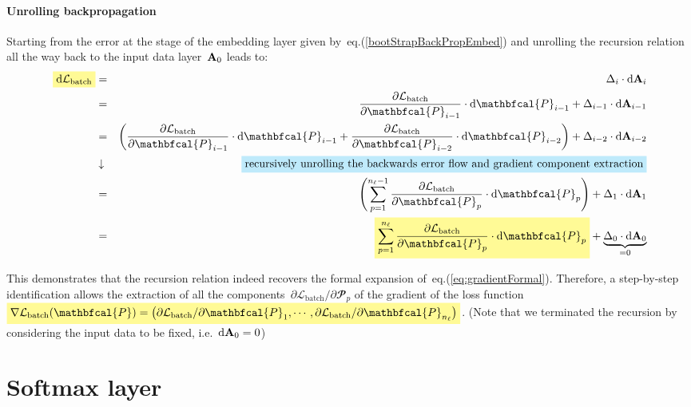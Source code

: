 \documentclass{article}
\newcommand{\mathcolorbox}[2]{\colorbox{#1}{$\displaystyle #2$}}
\begin{document}
\paragraph{Unrolling backpropagation} Starting from the error at the stage of the embedding layer given by~eq.(\ref{bootStrapBackPropEmbed}) and unrolling the recursion relation all the way back to the input data layer~${\bf A}_0$ leads to:
\begin{eqnarray*}
\mathcolorbox{shadecolor}{\text{d} \mathcal{L}_\text{batch}} &=& \Delta_i \cdot \text{d} {\bf A}_i \\ 
&=& \frac{\partial \mathcal{L}_{\text{batch}}}{\partial \mathbfcal{P}_{i-1}} \cdot \text{d}\mathbfcal{P}_{i-1} + \Delta_{i-1} \cdot \text{d}{\bf A}_{i-1} \\
&=& \left( \frac{\partial \mathcal{L}_{\text{batch}}}{\partial \mathbfcal{P}_{i-1}} \cdot \text{d}\mathbfcal{P}_{i-1} + \frac{\partial \mathcal{L}_{\text{batch}}}{\partial \mathbfcal{P}_{i-2}} \cdot \text{d}\mathbfcal{P}_{i-2}  \right) + \Delta_{i-2} \cdot \text{d} {\bf A}_{i-2} \\
&\downarrow& \colorbox{light-blue}{recursively unrolling the backwards error flow and gradient component extraction} \nonumber \\
&=& \left( \sum_{p=1}^{n_\ell-1} \frac{\partial \mathcal{L}_{\text{batch}}}{\partial \mathbfcal{P}_p} \cdot \text{d}\mathbfcal{P}_p \right) + \Delta_1 \cdot \text{d} {\bf A}_1 \\
&=& \mathcolorbox{shadecolor}{\sum_{p=1}^{n_\ell} \frac{\partial \mathcal{L}_{\text{batch}}}{\partial \mathbfcal{P}_p} \cdot \text{d}\mathbfcal{P}_p } + \underbrace{\Delta_0 \cdot \text{d} {\bf A}_0}_{= 0}
\end{eqnarray*}

\noindent This demonstrates that the recursion relation indeed recovers the formal expansion of~eq.(\ref{eq:gradientFormal}).  Therefore, a step-by-step identification allows the extraction of all the components~$\partial \mathcal{L}_{\text{batch}} / \partial \mathbfcal{P}_p$ of the gradient of the loss function~$\mathcolorbox{shadecolor}{\nabla \mathcal{L}_\text{batch} (\mathbfcal{P}) = \big( \partial \mathcal{L}_\text{batch} / \partial \mathbfcal{P}_1, \cdots, \partial \mathcal{L}_\text{batch} / \partial \mathbfcal{P}_{n_\ell} \big)}$. (Note that we terminated the recursion by considering the input data to be fixed, i.e.~$\text{d}{\bf A}_0 = 0$)

\section{Softmax layer}
\label{sec:softmaxLayer}
\end{document}
